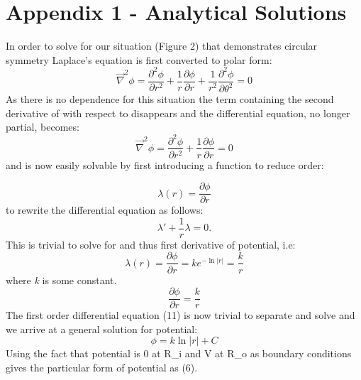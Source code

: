 \documentclass{article}
\begin{document}
\newpage
\section{Appendix 1 - Analytical Solutions}
In order to solve for our situation (Figure 2) that demonstrates circular symmetry Laplace's equation is first converted to polar form:
\begin{equation}
\vec{\nabla}^2\phi = \frac{\partial^2\phi}{\partial r^2}+\frac{1}{r}\frac{\partial\phi}{\partial r}+\frac{1}{r^2} \frac{\partial^2\phi}{\partial\theta^2}=0
\label{6}
\end{equation}
As there is no \theta\) dependence for this situation the term containing the second derivative of \phi\) with respect to \theta\) disappears and the differential equation, no longer partial, becomes:
\begin{equation}
\vec{\nabla}^2\phi = \frac{\partial^2\phi}{\partial r^2}+\frac{1}{r}\frac{\partial\phi}{\partial r}=0
\label{8}
\end{equation}
and is now easily solvable by first introducing a function to reduce order:


\begin{equation}
\lambda(r) = \frac{\partial\phi}{\partial r}
\label{10}
\end{equation}
to rewrite the differential equation as follows: 
\begin{equation}
\lambda ' + \frac{1}{r}\lambda = 0.
\label{11}
\end{equation}
This is trivial to solve for \lambda\) and thus first derivative of potential,  i.e:
\begin{equation}
\lambda(r) =  \frac{\partial\phi}{\partial r} = ke^{-\ln|r|} = \frac{k}{r}
\label{11}
\end{equation}
where \textit{k} is some constant.
\begin{equation}
 \frac{\partial\phi}{\partial r} = \frac{k}{r}
\label{11}
\end{equation}
The first order differential equation (11) is now trivial to separate and solve and we arrive at a general solution for potential:
\begin{equation}
\phi = k\ln|r| + C
\label{11}
\end{equation}
Using the fact that potential is 0 at R_i\) and V at R_o\) as boundary conditions gives the particular form of potential as (6). \\







\end{document}
